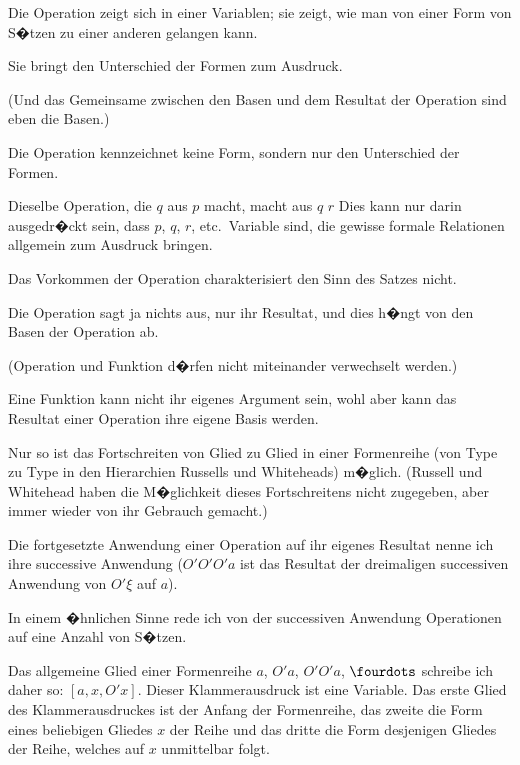{Die Operation zeigt sich in einer Variablen;
sie zeigt, wie man von einer Form von S�tzen zu
einer anderen gelangen kann.

Sie bringt den Unterschied der Formen zum
Ausdruck.

(Und das Gemeinsame zwischen den Basen
und dem Resultat der Operation sind eben die
Basen.)}


{Die Operation kennzeichnet keine Form, sondern
nur den Unterschied der Formen.}


{Dieselbe Operation, die \glqq{}$q$\grqq{} aus \glqq{}$p$\grqq{} macht,
macht aus \glqq{}$q$\grqq{} \glqq{}$r$\grqq{} \undSoFort{} Dies kann nur darin
ausgedr�ckt sein, dass \glqq{}$p$\grqq{}, \glqq{}$q$\grqq{}, \glqq{}$r$\grqq{}, etc.\ Variable
sind, die gewisse formale Relationen allgemein
zum Ausdruck bringen.}


{Das Vorkommen der Operation charakterisiert
den Sinn des Satzes nicht.

Die Operation sagt ja nichts aus, nur ihr Resultat,
und dies h�ngt von den Basen der Operation
ab.

(Operation und Funktion d�rfen nicht miteinander
verwechselt werden.)}


{Eine Funktion kann nicht ihr eigenes Argument
sein, wohl aber kann das Resultat einer Operation
ihre eigene Basis werden.}


{Nur so ist das Fortschreiten von Glied zu Glied
in einer Formenreihe (von Type zu Type in den
Hierarchien Russells und Whiteheads) m�glich.
(Russell und Whitehead haben die M�glichkeit
dieses Fortschreitens nicht zugegeben, aber immer
wieder von ihr Gebrauch gemacht.)}


{Die fortgesetzte Anwendung einer Operation
\enlargethispage{2pt} %
auf ihr eigenes Resultat nenne ich ihre successive
Anwendung (\glqq{}$O' O' O' a$\grqq{} ist das Resultat der
dreimaligen successiven Anwendung von \glqq{}$O' \xi$\grqq{}
auf \glqq{}$a$\grqq{}).

In einem �hnlichen Sinne rede ich von der
successiven Anwendung  Operationen
auf eine Anzahl von S�tzen.}


{{\stretchyspace
Das allgemeine Glied einer Formenreihe $a$, $O' a$,
$O' O' a$, $\fourdots$ schreibe ich daher so: \glqq{}$[a, x, O' x]$\grqq{}.
Dieser Klammerausdruck ist eine Variable. Das
erste Glied des Klammerausdruckes ist der Anfang
der Formenreihe, das zweite die Form eines
beliebigen Gliedes $x$ der Reihe und das dritte
die Form desjenigen Gliedes der Reihe, welches
auf $x$ unmittelbar folgt.}}


